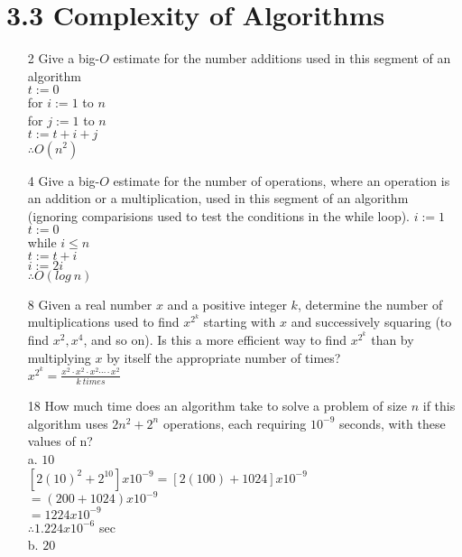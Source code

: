 \documentclass[a4paper]{article}
\newcommand\tab[1][0.5cm]{\hspace*{#1}}
\begin{document}
  \section*{3.3 Complexity of Algorithms}
  \begin{itemize}
    \item[2] Give a big-$O$ estimate for the number additions used in this segment of an algorithm \\
    \tab $t := 0$ \\
    \tab for $i := 1$ to $n$ \\
    \tab\tab for $j := 1$ to $n$ \\
    \tab\tab\tab $t := t + i + j$ \\
    \tab $\therefore O(n^2)$
    \item[4] Give a big-$O$ estimate for the number of operations, where an operation is an addition or a multiplication, used in this segment of an algorithm (ignoring comparisions used to test the conditions in the while loop).
    \tab $i := 1$ \\
    \tab $t := 0$ \\
    \tab while $i \leq n$ \\
    \tab\tab $t := t + i$ \\
    \tab\tab $i := 2i$ \\
    \tab $\therefore O(log\ n)$
    \item[8] Given a real number $x$ and a positive integer $k$, determine the number of multiplications used to find $x^{2^{k}}$ starting with $x$ and successively squaring (to find $x^{2}, x^{4}$, and so on). Is this a more efficient way to find $x^{2^{k}}$ than by multiplying $x$ by itself the appropriate number of times? \\
    \tab $x^{2^{k}} = \frac{x^2 \cdot x^2 \cdot x^2 \cdots \cdot x^2}{k\ times}$
    \item[18] How much time does an algorithm take to solve a problem of size $n$ if this algorithm uses $2n^{2} + 2^{n}$ operations, each requiring $10^{-9}$ seconds, with these values of n? \\
      a. $10$ \\
      \tab $[2(10)^2 + 2^{10}] x 10^{-9} = [2(100) + 1024] x 10^{-9}$ \\
      \tab\tab\tab $= (200 + 1024) x 10^{-9}$ \\
      \tab\tab\tab $= 1224 x 10^{-9}$ \\
      \tab\tab\tab $\therefore 1.224 x 10^{-6}$ sec \\
      b. $20$ \\

\end{itemize}
\end{document}
